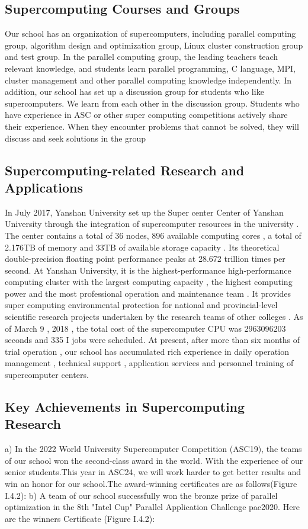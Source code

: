 \documentclass[a4paper,12pt]{article}
\begin{document}
\subsection{Supercomputing Courses and Groups}
Our school has an organization of supercomputers, including parallel computing group, algorithm design and optimization group, Linux cluster construction group and test group. In the parallel computing group, the leading teachers teach relevant knowledge, and students learn parallel programming, C language, MPI, cluster management and other parallel computing knowledge independently. In addition, our school has set up a discussion group for students who like supercomputers. We learn from each other in the discussion group. Students who have experience in ASC or other super computing competitions actively share their experience. When they encounter problems that cannot be solved, they will discuss and seek solutions in the group

\subsection{Supercomputing-related Research and Applications}
In July 2017, Yanshan University set up the Super center Center of Yanshan University through the integration of supercomputer resources in the university . The center contains a total of 36 nodes, 896 available computing cores , a total of 2.176TB of memory and 33TB of available storage capacity . Its theoretical double-precision floating point performance peaks at 28.672 trillion times per second. At Yanshan University, it is the highest-performance high-performance computing cluster with the largest computing capacity , the highest computing power and the most professional operation and maintenance team . It provides super computing environmental protection for national and provincial-level scientific research projects undertaken by the research teams of other colleges . As of March 9 , 2018 , the total cost of the supercomputer CPU was 2963096203 seconds and 335 I jobs were scheduled. At present, after more than six months of trial operation , our school has accumulated rich experience in daily operation management , technical support , application services and personnel training of supercomputer centers.

\subsection{Key Achievements in Supercomputing Research}
a) In the 2022 World University Supercomputer Competition (ASC19), the teams of our school won the second-class award in the world. With the experience of our senior students.This year in ASC24, we will work harder to get better results and win an honor for our school.The award-winning certificates are as follows(Figure I.4.2):
b) A team of our school successfully won the bronze prize of parallel optimization in the 8th "Intel Cup" Parallel Application Challenge pac2020. Here are the winners Certificate (Figure I.4.2):
\end{document}

